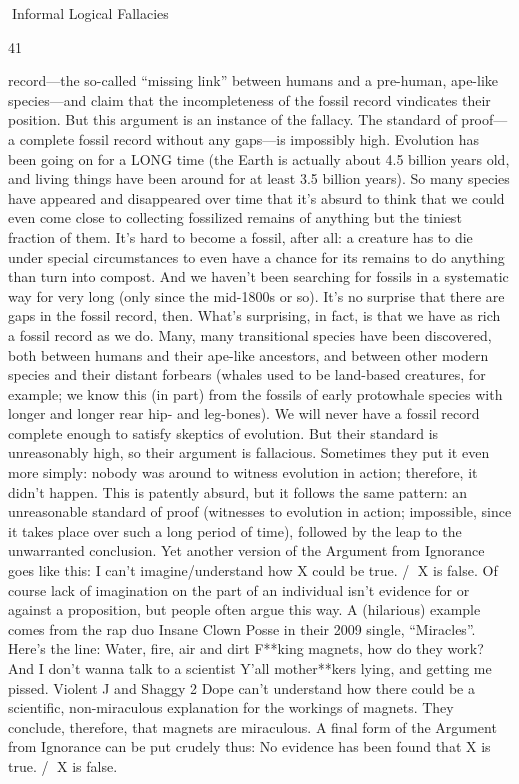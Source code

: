 Informal Logical Fallacies

41

record—the so-called “missing link” between humans and a pre-human, ape-like species—and
claim that the incompleteness of the fossil record vindicates their position.
But this argument is an instance of the fallacy. The standard of proof—a complete fossil record
without any gaps—is impossibly high. Evolution has been going on for a LONG time (the Earth
is actually about 4.5 billion years old, and living things have been around for at least 3.5 billion
years). So many species have appeared and disappeared over time that it’s absurd to think that we
could even come close to collecting fossilized remains of anything but the tiniest fraction of them.
It’s hard to become a fossil, after all: a creature has to die under special circumstances to even have
a chance for its remains to do anything than turn into compost. And we haven’t been searching for
fossils in a systematic way for very long (only since the mid-1800s or so). It’s no surprise that
there are gaps in the fossil record, then. What’s surprising, in fact, is that we have as rich a fossil
record as we do. Many, many transitional species have been discovered, both between humans and
their ape-like ancestors, and between other modern species and their distant forbears (whales used
to be land-based creatures, for example; we know this (in part) from the fossils of early protowhale species with longer and longer rear hip- and leg-bones).
We will never have a fossil record complete enough to satisfy skeptics of evolution. But their
standard is unreasonably high, so their argument is fallacious. Sometimes they put it even more
simply: nobody was around to witness evolution in action; therefore, it didn’t happen. This is
patently absurd, but it follows the same pattern: an unreasonable standard of proof (witnesses to
evolution in action; impossible, since it takes place over such a long period of time), followed by
the leap to the unwarranted conclusion.
Yet another version of the Argument from Ignorance goes like this:
I can’t imagine/understand how X could be true.
/ X is false.
Of course lack of imagination on the part of an individual isn’t evidence for or against a
proposition, but people often argue this way. A (hilarious) example comes from the rap duo Insane
Clown Posse in their 2009 single, “Miracles”. Here’s the line:
Water, fire, air and dirt
F**king magnets, how do they work?
And I don’t wanna talk to a scientist
Y’all mother**kers lying, and getting me pissed.
Violent J and Shaggy 2 Dope can’t understand how there could be a scientific, non-miraculous
explanation for the workings of magnets. They conclude, therefore, that magnets are miraculous.
A final form of the Argument from Ignorance can be put crudely thus:
No evidence has been found that X is true.
/ X is false.

